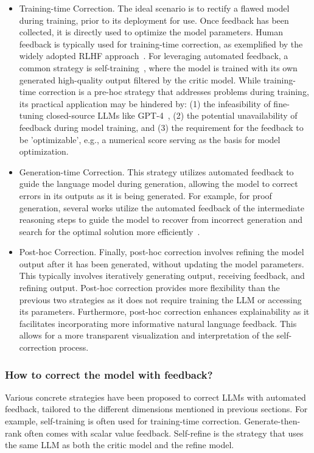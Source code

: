 \documentclass[12pt]{extarticle}
\begin{document}
\begin{itemize}
    \item Training-time Correction. The ideal scenario is to rectify a flawed model during training, prior to its deployment for use. Once feedback has been collected, it is directly used to optimize the model parameters. Human feedback is typically used for training-time correction, as exemplified by the widely adopted RLHF approach~\cite{ouyang2022training}. For leveraging automated feedback, a common strategy is self-training~\cite{huang2022large}, where the model is trained with its own generated high-quality output filtered by the critic model. While training-time correction is a pre-hoc strategy that addresses problems during training, its practical application may be hindered by: (1) the infeasibility of fine-tuning closed-source LLMs like GPT-4~\cite{openai2023gpt4}, (2) the potential unavailability of feedback during model training, and (3) the requirement for the feedback to be 'optimizable', e.g., a numerical score serving as the basis for model optimization.

    \item Generation-time Correction. This strategy utilizes automated feedback to guide the language model during generation, allowing the model to correct errors in its outputs as it is being generated. For example, for proof generation, several works utilize the automated feedback of the intermediate reasoning steps to guide the model to recover from incorrect generation and search for the optimal solution more efficiently~\cite{yang-etal-2022-generating, lightman2023lets}.

    \item Post-hoc Correction. Finally, post-hoc correction involves refining the model output after it has been generated, without updating the model parameters. This typically involves iteratively generating output, receiving feedback, and refining output. Post-hoc correction provides more flexibility than the previous two strategies as it does not require training the LLM or accessing its parameters. Furthermore, post-hoc correction enhances explainability as it facilitates incorporating more informative natural language feedback. This allows for a more transparent visualization and interpretation of the self-correction process.
\end{itemize}

\subsubsection{How to correct the model with feedback?}
Various concrete strategies have been proposed to correct LLMs with automated feedback, tailored to the different dimensions mentioned in previous sections. For example, self-training is often used for training-time correction. Generate-then-rank often comes with scalar value feedback. Self-refine is the strategy that uses the same LLM as both the critic model and the refine model.
\end{document}
